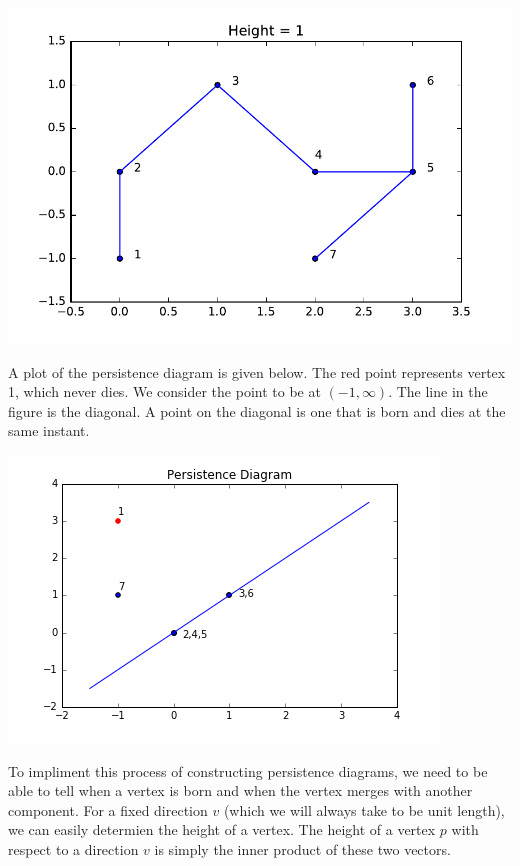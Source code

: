 \documentclass[11pt]{amsart}
\begin{document}
\includegraphics[width = \textwidth]{persist_diag3.pdf}

A plot of the persistence diagram is given below.  The red point represents vertex 1, which never dies.  We consider the point to be at $(-1,\infty)$.  The line in the figure is the diagonal.  A point on the diagonal is one that is born and dies at the same instant.  

\includegraphics[width = \textwidth]{diagram.png}

To impliment this process of constructing persistence diagrams, we need to be able to tell when a vertex is born and when the vertex merges with another component.  For a fixed direction $v$ (which we will always take to be unit length), we can easily determien the height of a vertex. The height of a vertex $p$ with respect to a direction $v$ is simply the inner product of these two vectors.  
\end{document}
